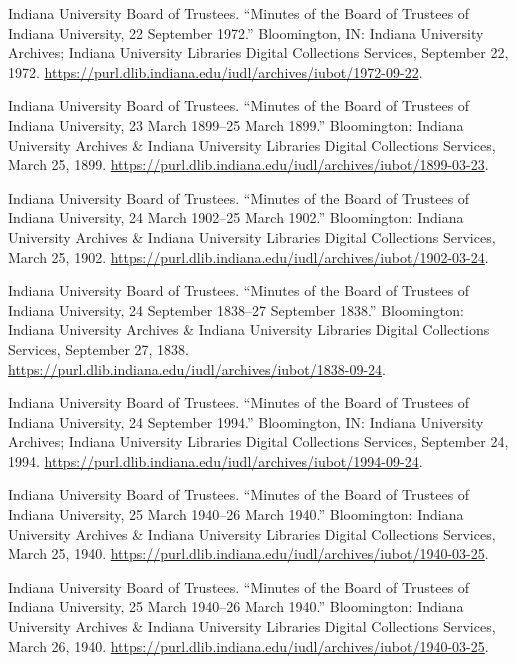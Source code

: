 \documentclass[
  american,
  letterpaper,
]{scrreprt}
\newlength{\cslhangindent}
\newenvironment{CSLReferences}[2] %
 {\begin{list}{}{%
  \setlength{\itemindent}{0pt}
  \setlength{\leftmargin}{0pt}
  \setlength{\parsep}{0pt}
  \ifodd #1
   \setlength{\leftmargin}{\cslhangindent}
   \setlength{\itemindent}{-1\cslhangindent}
  \fi
  \setlength{\itemsep}{#2\baselineskip}}}
 {\end{list}}
\begin{document}
\begin{CSLReferences}{1}{0}
Indiana University Board of Trustees. {``Minutes of the Board of
Trustees of Indiana University, 22 September 1972.''} Bloomington, IN:
Indiana University Archives; Indiana University Libraries Digital
Collections Services, September 22, 1972.
\url{https://purl.dlib.indiana.edu/iudl/archives/iubot/1972-09-22}.

Indiana University Board of Trustees. {``Minutes of the Board of
Trustees of Indiana University, 23 March 1899--25 March 1899.''}
Bloomington: Indiana University Archives \& Indiana University Libraries
Digital Collections Services, March 25, 1899.
\url{https://purl.dlib.indiana.edu/iudl/archives/iubot/1899-03-23}.

Indiana University Board of Trustees. {``Minutes of the Board of
Trustees of Indiana University, 24 March 1902--25 March 1902.''}
Bloomington: Indiana University Archives \& Indiana University Libraries
Digital Collections Services, March 25, 1902.
\url{https://purl.dlib.indiana.edu/iudl/archives/iubot/1902-03-24}.

Indiana University Board of Trustees. {``Minutes of the Board of
Trustees of Indiana University, 24 September 1838--27 September 1838.''}
Bloomington: Indiana University Archives \& Indiana University Libraries
Digital Collections Services, September 27, 1838.
\url{https://purl.dlib.indiana.edu/iudl/archives/iubot/1838-09-24}.

Indiana University Board of Trustees. {``Minutes of the Board of
Trustees of Indiana University, 24 September 1994.''} Bloomington, IN:
Indiana University Archives; Indiana University Libraries Digital
Collections Services, September 24, 1994.
\url{https://purl.dlib.indiana.edu/iudl/archives/iubot/1994-09-24}.

Indiana University Board of Trustees. {``Minutes of the Board of
Trustees of Indiana University, 25 March 1940--26 March 1940.''}
Bloomington: Indiana University Archives \& Indiana University Libraries
Digital Collections Services, March 25, 1940.
\url{https://purl.dlib.indiana.edu/iudl/archives/iubot/1940-03-25}.

Indiana University Board of Trustees. {``Minutes of the Board of
Trustees of Indiana University, 25 March 1940--26 March 1940.''}
Bloomington: Indiana University Archives \& Indiana University Libraries
Digital Collections Services, March 26, 1940.
\url{https://purl.dlib.indiana.edu/iudl/archives/iubot/1940-03-25}.


\end{CSLReferences}
\end{document}
